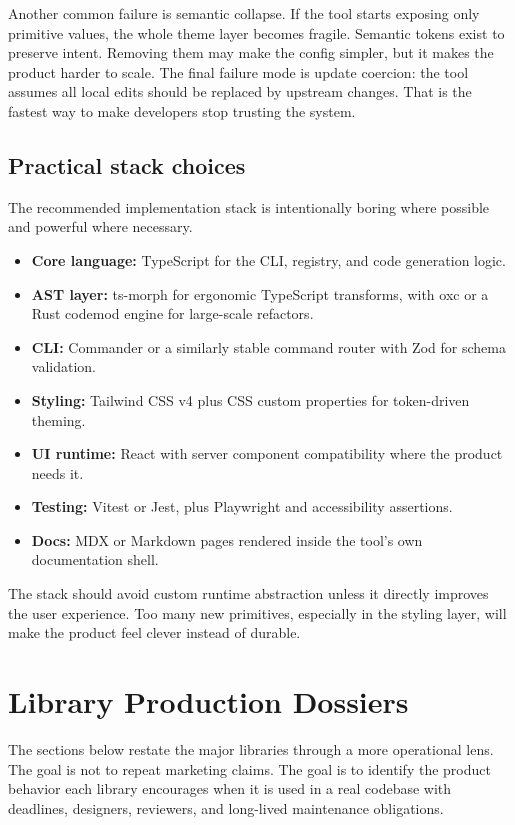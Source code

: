 \documentclass[11pt,twoside,a4paper]{article}
\begin{document}
Another common failure is semantic collapse. If the tool starts exposing only primitive values, the whole theme layer becomes fragile. Semantic tokens exist to preserve intent. Removing them may make the config simpler, but it makes the product harder to scale. The final failure mode is update coercion: the tool assumes all local edits should be replaced by upstream changes. That is the fastest way to make developers stop trusting the system.

\subsection{Practical stack choices}
The recommended implementation stack is intentionally boring where possible and powerful where necessary.

\begin{itemize}[leftmargin=*, itemsep=0.35em]
  \item \textbf{Core language:} TypeScript for the CLI, registry, and code generation logic.
  \item \textbf{AST layer:} ts-morph for ergonomic TypeScript transforms, with oxc or a Rust codemod engine for large-scale refactors.
  \item \textbf{CLI:} Commander or a similarly stable command router with Zod for schema validation.
  \item \textbf{Styling:} Tailwind CSS v4 plus CSS custom properties for token-driven theming.
  \item \textbf{UI runtime:} React with server component compatibility where the product needs it.
  \item \textbf{Testing:} Vitest or Jest, plus Playwright and accessibility assertions.
  \item \textbf{Docs:} MDX or Markdown pages rendered inside the tool's own documentation shell.
\end{itemize}

The stack should avoid custom runtime abstraction unless it directly improves the user experience. Too many new primitives, especially in the styling layer, will make the product feel clever instead of durable.

\section{Library Production Dossiers}
The sections below restate the major libraries through a more operational lens. The goal is not to repeat marketing claims. The goal is to identify the product behavior each library encourages when it is used in a real codebase with deadlines, designers, reviewers, and long-lived maintenance obligations.
\end{document}
